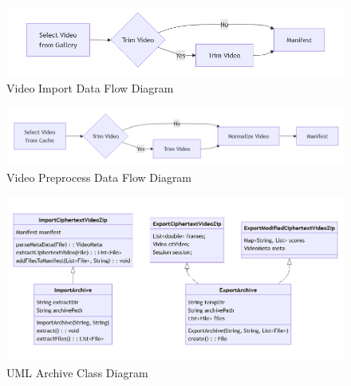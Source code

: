 \documentclass [11pt, proquest] {uwthesis}[2020/02/24]
\begin{document}
\begin{figure}
  \centering
  \includegraphics[width=\textwidth,height=\textheight,keepaspectratio]{Appendix/Figures/videoImport.png}
  \caption{Video Import Data Flow Diagram}
  \label{fig:appendix_videoImportDataFlow}
\end{figure}

\begin{figure}
  \centering
  \includegraphics[width=\textwidth,height=\textheight,keepaspectratio]{Appendix/Figures/videoPreprocess.png}
  \caption{Video Preprocess Data Flow Diagram}
  \label{fig:appendix_videoPreprocessDataFlow}
\end{figure}

\begin{figure}
  \centering
  \includegraphics[width=\textwidth,height=\textheight,keepaspectratio]{Appendix/Figures/shareArchiveClass.png}
  \caption{UML Archive Class Diagram}
  \label{fig:appendix_archiveClass}
\end{figure}
\end{document}

